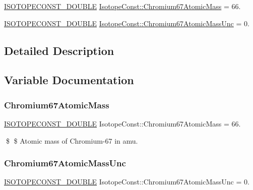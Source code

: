 \begin{DoxyCompactItemize}
\item 
\mbox{\hyperlink{group___isotope_const-_macros_ga8f45a7272ce02c0b4c65c44636ed719a}{I\+S\+O\+T\+O\+P\+E\+C\+O\+N\+S\+T\+\_\+\+D\+O\+U\+B\+LE}} \mbox{\hyperlink{group___isotope_const-_chromium-_cr67_ga1c30e43cd43cd5162f598545c1b79994}{Isotope\+Const\+::\+Chromium67\+Atomic\+Mass}} = 66.
\item 
\mbox{\hyperlink{group___isotope_const-_macros_ga8f45a7272ce02c0b4c65c44636ed719a}{I\+S\+O\+T\+O\+P\+E\+C\+O\+N\+S\+T\+\_\+\+D\+O\+U\+B\+LE}} \mbox{\hyperlink{group___isotope_const-_chromium-_cr67_gaf5b5be08f87308ffe15b7c20d56ad844}{Isotope\+Const\+::\+Chromium67\+Atomic\+Mass\+Unc}} = 0.
\end{DoxyCompactItemize}


\subsection{Detailed Description}


\subsection{Variable Documentation}
\mbox{\label{group___isotope_const-_chromium-_cr67_ga1c30e43cd43cd5162f598545c1b79994}} 
\subsubsection{\texorpdfstring{Chromium67\+Atomic\+Mass}{Chromium67AtomicMass}}
{\footnotesize\ttfamily \mbox{\hyperlink{group___isotope_const-_macros_ga8f45a7272ce02c0b4c65c44636ed719a}{I\+S\+O\+T\+O\+P\+E\+C\+O\+N\+S\+T\+\_\+\+D\+O\+U\+B\+LE}} Isotope\+Const\+::\+Chromium67\+Atomic\+Mass = 66.}

\$ \$ Atomic mass of Chromium-\/67 in amu. \mbox{\label{group___isotope_const-_chromium-_cr67_gaf5b5be08f87308ffe15b7c20d56ad844}} 
\subsubsection{\texorpdfstring{Chromium67\+Atomic\+Mass\+Unc}{Chromium67AtomicMassUnc}}
{\footnotesize\ttfamily \mbox{\hyperlink{group___isotope_const-_macros_ga8f45a7272ce02c0b4c65c44636ed719a}{I\+S\+O\+T\+O\+P\+E\+C\+O\+N\+S\+T\+\_\+\+D\+O\+U\+B\+LE}} Isotope\+Const\+::\+Chromium67\+Atomic\+Mass\+Unc = 0.}

